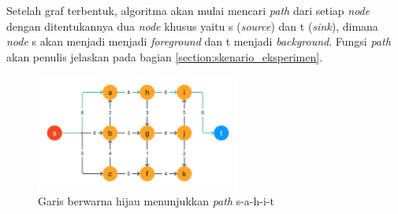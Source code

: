 

Setelah graf terbentuk, algoritma akan mulai mencari \emph{path} dari setiap \emph{node}
dengan ditentukannya dua \emph{node} khusus yaitu s (\emph{source}) dan t (\emph{sink}), 
dimana \emph{node} s akan menjadi  menjadi \emph{foreground} dan t menjadi \emph{background}.
Fungsi \emph{path} akan penulis jelaskan pada bagian \ref{section:skenario_eksperimen}.

\begin{figure}[H]
	\centering{}
	\includegraphics[width=0.6\textwidth]{gambar/contoh_path.png}
	\caption{Garis berwarna hijau menunjukkan \emph{path} s-a-h-i-t}
\end{figure}

